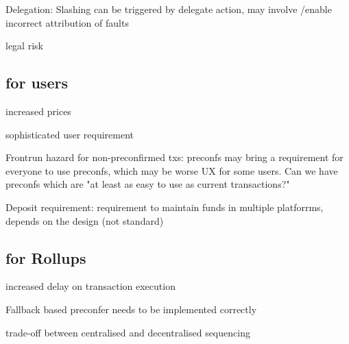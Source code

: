 \documentclass[conference]{IEEEtran}
\theoremstyle{boldstyle}
\begin{document}
    Delegation: Slashing can be triggered by delegate action, may involve /enable incorrect attribution of faults  %
    
    legal risk %
    
    \subsection{for users}
    
    increased prices %
    
    sophisticated user requirement %
    
    Frontrun hazard for non-preconfirmed txs: preconfs may bring a requirement for everyone to use preconfs, which may be worse UX for some users. Can we have preconfs which are "at least as easy to use as current transactions?" %
    
    Deposit requirement: requirement to maintain funds in multiple platforrms, depends on the design (not standard)%
    
    \subsection{for Rollups}
    increased delay on transaction execution %
    
    Fallback based preconfer needs to be implemented correctly%
    
    trade-off between centralised and decentralised sequencing %
\end{document}
